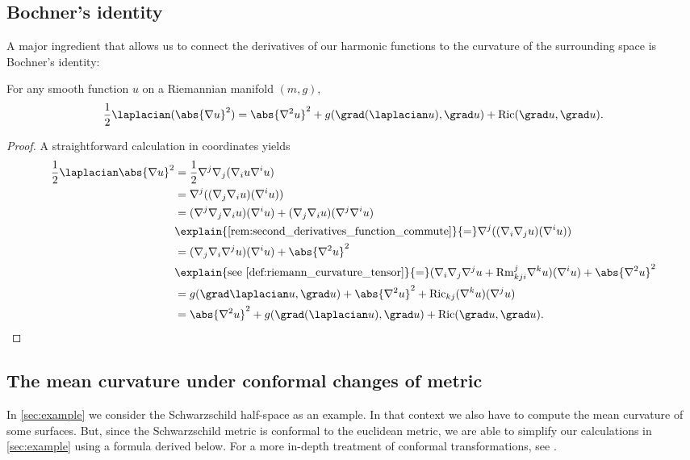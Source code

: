 \documentclass[titlepage,numbers=noenddot,oneside,%
cleardoublepage=empty,paper=a4,fontsize=11pt,%
english,%
]{scrartcl}
\newcommand{\Ricci}{\mathrm{Ric}} %
\newcommand{\riemanncurvature}{\mathrm{Rm}} %
\begin{document}
\subsection{Bochner's identity}
A major ingredient that allows us to connect the derivatives of our harmonic functions to the curvature of the surrounding space is Bochner's identity:
\begin{lemma}\label{lem:bochner_identity}
    For any smooth function \( u \) on a Riemannian manifold \( (m,g) \),
    \begin{equation*}
        \frac{1}{2}\laplacian(\abs{\nabla u}^2)=\abs{\nabla^2 u}^2+g(\grad (\laplacian u),\grad u)+\Ricci(\grad u, \grad u).
    \end{equation*} 
\end{lemma}
\begin{proof}
    A straightforward calculation in coordinates yields
    \begin{equation*}
        \begin{aligned}[t]
            \frac{1}{2}\laplacian \abs{\nabla u}^2&=\frac{1}{2}\nabla^j\nabla_j(\nabla_i u \nabla^i u)\\
            &=\nabla^j((\nabla_j \nabla_i u)(\nabla^i u))\\
            &=(\nabla^j \nabla_j\nabla_i u)(\nabla^i u)+(\nabla_j \nabla_i u)(\nabla^j \nabla^i u)\\
            &\explain{\text{\cref{rem:second_derivatives_function_commute}}}{=}\nabla^j((\nabla_i \nabla_j u)(\nabla^i u))\\
            &=(\nabla_j \nabla_i \nabla^j u)(\nabla^i u)+\abs{\nabla^2 u}^2\\
            &\explain{\text{see \cref{def:riemann_curvature_tensor}}}{=}(\nabla_i \nabla_j \nabla^j u+\riemanncurvature_{kji}^j \nabla^k u)(\nabla^i u)+\abs{\nabla^2 u}^2\\
            &=g(\grad \laplacian u,\grad u)+\abs{\nabla^2 u}^2+\Ricci_{kj}(\nabla^k u)(\nabla^j u)\\
            &=\abs{\nabla^2 u}^2+g(\grad (\laplacian u),\grad u)+\Ricci(\grad u, \grad u).
        \end{aligned}
    \end{equation*}
\end{proof}
\subsection{The mean curvature under conformal changes of metric}\label{sec:conformal_changes_of_metric}
In \cref{sec:example} we consider the Schwarzschild half-space as an example. In that context we also have to compute the mean curvature of some surfaces. But, since the Schwarzschild metric is conformal to the euclidean metric, we are able to simplify our calculations in \cref{sec:example} using a formula derived below. For a more in-depth treatment of conformal transformations, see \cite{curryIntroductionConformalGeometry2015}.
\end{document}
